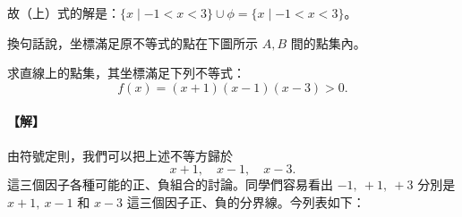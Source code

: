 故（上）式的解是：$\{x \mid -1<x<3\}\cup\phi = \{x \mid -1<x<3\}$。

換句話說，坐標滿足原不等式的點在下圖所示 $A, B$ 間的點集內。

\begin{figure}[H]
\centering
{}
\end{figure}

\begin{example}\label{ex:b2_2-3-3}
求直線上的點集，其坐標滿足下列不等式：
\[
f(x)=(x+1)(x-1)(x-3)>0.
\]
\end{example}
\paragraph{【解】} 由符號定則，我們可以把上述不等方歸於
\[
x+1,\quad x-1,\quad x-3.
\]
這三個因子各種可能的正、負組合的討論。同學們容易看出 $-1,\ +1,\ +3$ 分別是 $x+1,\ x-1$ 和 $x-3$ 這三個因子正、負的分界線。今列表如下：

